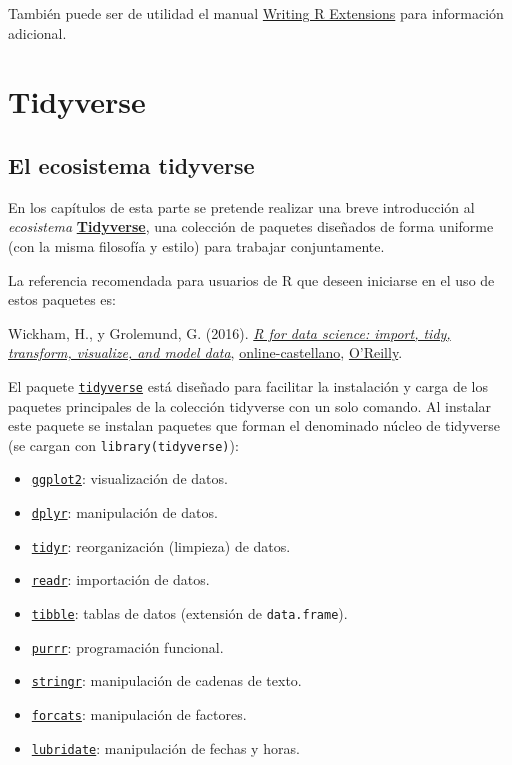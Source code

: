\documentclass[
]{book}
\providecommand{\tightlist}{%
  \setlength{\itemsep}{0pt}\setlength{\parskip}{0pt}}
\theoremstyle{break}
\theoremstyle{nonumberplain}
\begin{document}
También puede ser de utilidad el manual \href{http://colinfay.me/writing-r-extensions}{Writing R Extensions} para información adicional.

\hypertarget{part-tidyverse}{%
\part{Tidyverse}\label{part-tidyverse}}

\hypertarget{tidyverse}{%
\chapter{El ecosistema tidyverse}\label{tidyverse}}

En los capítulos de esta parte se pretende realizar una breve introducción al \emph{ecosistema} \href{https://dplyr.tidyverse.org}{\textbf{Tidyverse}}, una colección de paquetes diseñados de forma uniforme (con la misma filosofía y estilo) para trabajar conjuntamente.

La referencia recomendada para usuarios de R que deseen iniciarse en el uso de estos paquetes es:

Wickham, H., y Grolemund, G. (2016). \emph{\href{http://r4ds.had.co.nz}{R for data science: import, tidy, transform, visualize, and model data}}, \href{https://es.r4ds.hadley.nz}{online-castellano}, \href{http://shop.oreilly.com/product/0636920034407.do}{O'Reilly}.

El paquete \href{https://tidyverse.tidyverse.org}{\texttt{tidyverse}} está diseñado para facilitar la instalación y carga de los paquetes principales de la colección tidyverse con un solo comando.
Al instalar este paquete se instalan paquetes que forman el denominado núcleo de tidyverse (se cargan con \texttt{library(tidyverse)}):

\begin{itemize}
\tightlist
\item
  \href{https://ggplot2.tidyverse.org}{\texttt{ggplot2}}: visualización de datos.
\item
  \href{https://dplyr.tidyverse.org}{\texttt{dplyr}}: manipulación de datos.
\item
  \href{https://tidyr.tidyverse.org}{\texttt{tidyr}}: reorganización (limpieza) de datos.
\item
  \href{https://readr.tidyverse.org}{\texttt{readr}}: importación de datos.
\item
  \href{https://tibble.tidyverse.org}{\texttt{tibble}}: tablas de datos (extensión de \texttt{data.frame}).
\item
  \href{https://purrr.tidyverse.org}{\texttt{purrr}}: programación funcional.
\item
  \href{https://github.com/tidyverse/stringr}{\texttt{stringr}}: manipulación de cadenas de texto.
\item
  \href{https://github.com/tidyverse/forcats}{\texttt{forcats}}: manipulación de factores.
\item
  \href{https://github.com/tidyverse/lubridate}{\texttt{lubridate}}: manipulación de fechas y horas.
\end{itemize}
\end{document}
